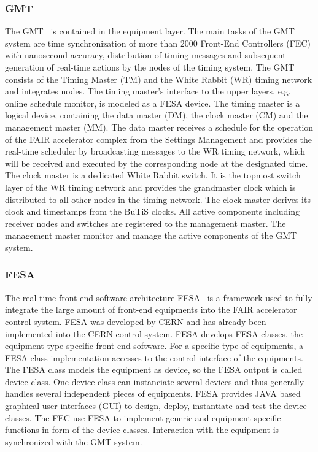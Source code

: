 \subsubsection{GMT}
The GMT~\cite{beck_new_2012} is contained in the equipment layer. The main tasks of the GMT system are time synchronization of more than 2000 Front-End Controllers (\gls{FEC}) with nanosecond accuracy, distribution of timing messages and subsequent generation of real-time actions by the nodes of the timing system. The GMT consists of the Timing Master (\gls{TM}) and the White Rabbit (WR) timing network and integrates nodes. The timing master's interface to the upper layers, e.g. online schedule monitor, is modeled as a FESA device. The timing master is a logical device, containing the data master (\gls{DM}), the clock master (\gls{CM}) and the management master (\gls{MM}). The data master receives a schedule for the operation of the FAIR accelerator complex from the Settings Management and provides the real-time scheduler by broadcasting messages to the WR timing network, which will be received and executed by the corresponding node at the designated time. The clock master is a dedicated White Rabbit switch. It is the topmost switch layer of the WR timing network and provides the grandmaster clock which is distributed to all other nodes in the timing network. The clock master derives its clock and timestamps from the BuTiS clocks. All active components including receiver nodes and switches are registered to the management master. The management master monitor and manage the active components of the GMT system.

\subsubsection{FESA}
The real-time front-end software architecture \gls{FESA}~\cite{hoffmann_fesafront-end_2008} is a framework used to fully integrate the large amount of front-end equipments into the FAIR accelerator control system. FESA was developed by CERN and has already been implemented into the CERN control system. FESA develops FESA classes, the equipment-type specific front-end software. For a specific type of equipments, a FESA class implementation accesses to the control interface of the equipments. The FESA class models the equipment as device, so the FESA output is called device class. One device class can instanciate several devices and thus generally handles several independent pieces of equipments.  FESA provides JAVA based graphical user interfaces (GUI) to design, deploy, instantiate and test the device classes. The FEC use FESA to implement generic and equipment specific functions in form of the device classes. Interaction with the equipment is synchronized with the GMT system. 

